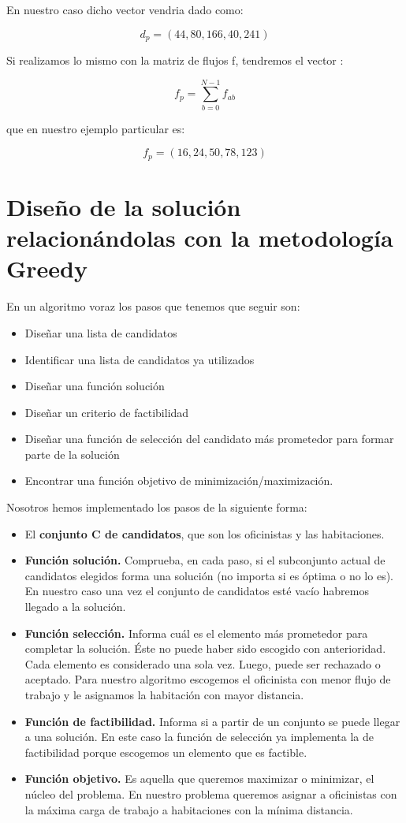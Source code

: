 \documentclass[11pt, a4paper]{article}
\theoremstyle{theorem-style}
\theoremstyle{definition-style}
\theoremstyle{remark-style}
\theoremstyle{example-style}
\begin{document}
En nuestro caso dicho vector vendria dado como:

\[
d_{p}=(44,80,166,40,241)
\]

Si realizamos lo mismo con la matriz de flujos f, tendremos el vector
:

\[
f_{p}={\displaystyle \sum_{b=0}^{N-1}f_{ab}}
\]

que en nuestro ejemplo particular es:

\[
f_{p}=(16,24,50,78,123)
\]


\section{Diseño de la solución relacionándolas con la metodología Greedy}

En un algoritmo voraz los pasos que tenemos que seguir son: 
\begin{itemize}
\item Diseñar una lista de candidatos 
\item Identificar una lista de candidatos ya utilizados 
\item Diseñar una función solución 
\item Diseñar un criterio de factibilidad
\item Diseñar una función de selección del candidato más prometedor para
formar parte de la solución 
\item Encontrar una función objetivo de minimización/maximización. 
\end{itemize}
Nosotros hemos implementado los pasos de la siguiente forma:
\begin{itemize}
\item El \textbf{conjunto C de candidatos}, que son los oficinistas y las habitaciones.
\item \textbf{Función solución.} Comprueba, en cada paso, si el subconjunto
actual de candidatos elegidos forma una solución (no importa si es
óptima o no lo es). En nuestro caso una vez el conjunto de candidatos
esté vacío habremos llegado a la solución. 
\item \textbf{Función selección.} Informa cuál es el elemento más prometedor
para completar la solución. Éste no puede haber sido escogido con
anterioridad. Cada elemento es considerado una sola vez. Luego, puede
ser rechazado o aceptado. Para nuestro algoritmo escogemos el oficinista
con menor flujo de trabajo y le asignamos la habitación con mayor
distancia.
\item \textbf{Función de factibilidad.} Informa si a partir de un conjunto
se puede llegar a una solución. En este caso la función de selección
ya implementa la de factibilidad porque escogemos un elemento que
es factible.
\item \textbf{Función objetivo.} Es aquella que queremos maximizar o minimizar,
el núcleo del problema. En nuestro problema queremos asignar a oficinistas
con la máxima carga de trabajo a habitaciones con la mínima distancia. 
\end{itemize}
\end{document}
